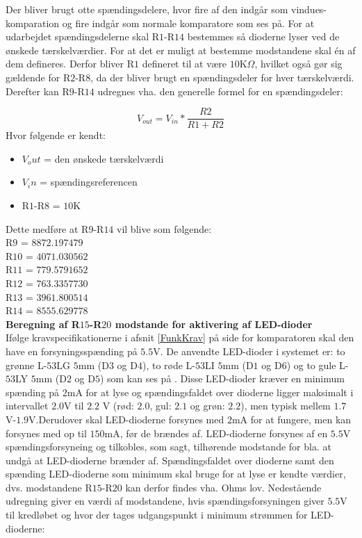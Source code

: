 Der bliver brugt otte spændingsdelere, hvor fire af den indgår som vindues-komparation og fire indgår som normale komparatore som ses på. 
For at udarbejdet spændingsdelerne skal R$1$-R$14$ bestemmes så dioderne lyser ved de ønskede tærskelværdier. For at det er muligt at bestemme modstandene skal én af dem defineres.  Derfor bliver R$1$ defineret til at være $10$K$\Omega$, hvilket også gør sig gældende for R$2$-R$8$, da der bliver brugt en spændingsdeler for hver tærskelværdi. Derefter kan R$9$-R$14$ udregnes vha. den generelle formel for en spændingsdeler:

\begin{equation}
V_{out}=V_{in}*\dfrac{R2}{R1+R2}
\end{equation}
Hvor følgende er kendt:
\begin{itemize}
\item $V_out$ = den ønskede tærskelværdi
\item $V_in$ = spændingsreferencen
\item R$1$-R$8$ = $10$K
\end{itemize}

Dette medføre at R$9$-R$14$ vil blive som følgende:\\
R$9$ = $8872.197479$\\
R$10$ = $4071.030562$ \\
R$11$ = $779.5791652$ \\
R$12$ = $763.3357730$ \\
R$13$ = $3961.800514$ \\
R$14$ = $8555.629778$ \\


\noindent\textbf{Beregning af R$15$-R$20$ modstande for aktivering af LED-dioder} \\
Ifølge kravspecifikationerne i afsnit \ref{FunkKrav}  på side \pageref{FunkKrav} for komparatoren skal den have en forsyningsspænding på  $5.5$V. De anvendte LED-dioder i systemet er: to grønne L-$53$LG $5$mm (D$3$  og D$4$), to røde L-$53$LI $5$mm (D$1$ og D$6$) og to gule L-$53$LY $5$mm (D$2$ og D$5$) som kan ses på . Disse LED-dioder kræver en minimum spænding på 2mA for at lyse og spændingsfaldet over dioderne ligger maksimalt i intervallet $2.0$V til $2.2$ V (rød: $2.0$, gul: $2.1$ og grøn: $2.2$), men typisk mellem $1.7$V-$1.9$V.Derudover skal LED-dioderne forsynes med $2$mA for at fungere, men kan forsynes med op til $150$mA, før de brændes af. LED-dioderne forsynes af en $5.5$V spændingsforsyneing og tilkobles, som sagt, tilhørende modstande for bla. at undgå at LED-dioderne brænder af. Spændingsfaldet over dioderne samt den spænding LED-dioderne som minimum skal bruge for at lyse er kendte værdier, dvs. modstandene R$15$-R$20$ kan derfor findes vha. Ohms lov. Nedestående udregning giver en værdi af modstandene, hvis spændingsforsyningen giver $5.5$V til kredløbet og hvor der tages udgangspunkt i  minimum strømmen for LED-dioderne:

